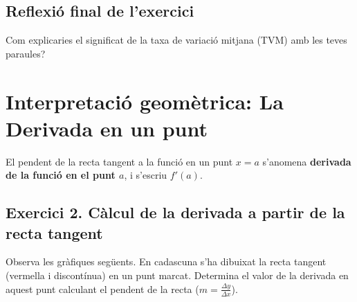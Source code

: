 \documentclass[12pt,a4paper]{article}
\begin{document}
\subsection*{Reflexió final de l'exercici}

Com explicaries el significat de la taxa de variació mitjana (TVM) amb les teves paraules?

\newpage

\section*{Interpretació geomètrica: La Derivada en un punt}

El pendent de la recta tangent a la funció en un punt $x = a$ s'anomena \textbf{derivada de la funció en el punt $a$}, i s'escriu $f'(a)$. 

\subsection*{Exercici 2. Càlcul de la derivada a partir de la recta tangent}

Observa les gràfiques següents. En cadascuna s'ha dibuixat la recta tangent (vermella i discontínua) en un punt marcat. Determina el valor de la derivada en aquest punt calculant el pendent de la recta ($m = \frac{\Delta y}{\Delta x}$).
\end{document}
